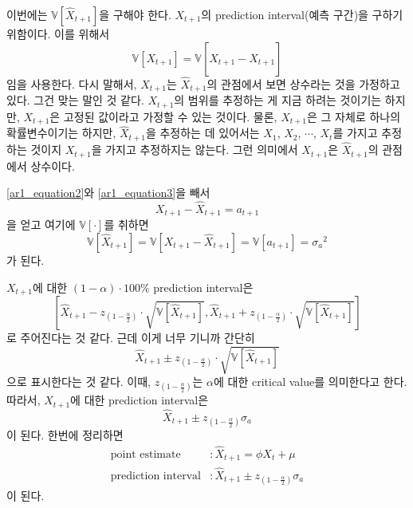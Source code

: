 \documentclass{article}
\newcommand\sa{\ensuremath{{\sigma_a}}}
\begin{document}
이번에는 \(\mathbb V[\hat X_{t+1}]\)을 구해야 한다.
\(X_{t+1}\)의 prediction interval(예측 구간)을 구하기 위함이다.
이를 위해서
\[\mathbb V[X_{t+1}]=\mathbb V[\hat \hat X_{t+1}-X_{t+1}]\]
임을 사용한다.
다시 말해서, \(X_{t+1}\)는 \(\hat X_{t+1}\)의 관점에서 보면 상수라는 것을 가정하고 있다.
그건 맞는 말인 것 같다.
\(X_{t+1}\)의 범위를 추정하는 게 지금 하려는 것이기는 하지만, \(X_{t+1}\)은 고정된 값이라고 가정할 수 있는 것이다.
물론, \(X_{t+1}\)은 그 자체로 하나의 확률변수이기는 하지만, \(\hat X_{t+1}\)을 추정하는 데 있어서는 \(X_1\), \(X_2\), \(\cdots\), \(X_t\)를 가지고 추정하는 것이지 \(X_{t+1}\)을 가지고 추정하지는 않는다.
그런 의미에서 \(X_{t+1}\)은 \(\hat X_{t+1}\)의 관점에서 상수이다.

\eqref{ar1_equation2}와 \eqref{ar1_equation3}을 빼서
\[X_{t+1}-\hat X_{t+1}=a_{t+1}\]
을 얻고 여기에 \(\mathbb V[\cdot]\)를 취하면
\[\mathbb V[\hat X_{t+1}]=\mathbb V[X_{t+1}-\hat X_{t+1}]=\mathbb V[a_{t+1}]=\sa^2\]
가 된다.

\(X_{t+1}\)에 대한 \((1-\alpha)\cdot100\%\) prediction interval은
\[\left[\hat X_{t+1}-z_{(1-\frac\alpha2)}\cdot\sqrt{\mathbb V[\hat X_{t+1}]},
\hat X_{t+1}+z_{(1-\frac\alpha2)}\cdot\sqrt{\mathbb V[\hat X_{t+1}]}\right]\]
로 주어진다는 것 같다.
근데 이게 너무 기니까 간단히
\[\hat X_{t+1}\pm z_{(1-\frac\alpha2)}\cdot\sqrt{\mathbb V[\hat X_{t+1}]}\]
으로 표시한다는 것 같다.
이때, \(z_{(1-\frac\alpha2)}\)는 \(\alpha\)에 대한 critical value를 의미한다고 한다.
따라서, \(X_{t+1}\)에 대한 prediction interval은
\begin{equation}\label{ar1_equation4}
\hat X_{t+1}\pm z_{(1-\frac\alpha2)}\sa
\end{equation}
이 된다.
한번에 정리하면
\begin{align*}
\text{point estimate}		&:\hat X_{t+1} = \phi X_t+\mu\\
\text{prediction interval}	&:\hat X_{t+1}\pm z_{(1-\frac\alpha2)}\sa
\end{align*}
이 된다.

%
\end{document}
